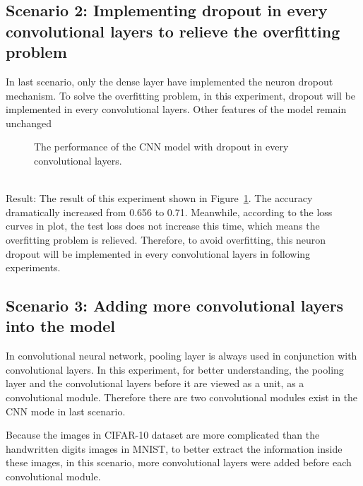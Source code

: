 \documentclass[]{UCD_CS_FYP_Report}
\begin{document}
\subsection{Scenario 2: Implementing dropout in every convolutional layers to relieve the overfitting problem}
In last scenario, only the dense layer have implemented the neuron dropout mechanism. To solve the overfitting problem, in this experiment, dropout will be implemented in every convolutional layers. Other features of the model remain unchanged
\begin{figure}[h]
\centering
\fboxsep 2mm
\caption{\label{fig:CIFAR_10_CNN_S2E1} The performance of the CNN model with dropout in every convolutional layers.}
\end{figure}
\\Result: The result of this experiment shown in Figure~\ref{fig:CIFAR_10_CNN_S2E1}. The accuracy dramatically increased from 0.656 to 0.71. Meanwhile, according to the loss curves in plot, the test loss does not increase this time, which means the overfitting problem is relieved. Therefore, to avoid overfitting, this neuron dropout will be implemented in every convolutional layers in following experiments. 
\subsection{Scenario 3: Adding more convolutional layers into the model}
In convolutional neural network, pooling layer is always used in conjunction with convolutional layers. In this experiment, for better understanding, the pooling layer and the convolutional layers before it are viewed as a unit, as a convolutional module. Therefore there are two convolutional modules exist in the CNN mode in last scenario. 

Because the images in CIFAR-10 dataset are more complicated than the handwritten digits images in MNIST, to better extract the information inside these images, in this scenario, more convolutional layers were added before each convolutional module. 
%
\end{document}
